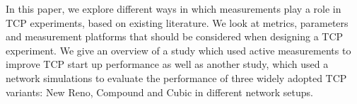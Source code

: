 In this paper, we explore different ways in which measurements play a role in TCP experiments, based on existing literature. We look at metrics, parameters and measurement platforms that should be considered when designing a TCP experiment. We give an overview of a study which used active measurements to improve TCP start up performance as well as another study, which used a network simulations to evaluate the performance of three widely adopted TCP variants: New Reno, Compound and Cubic in different network setups.